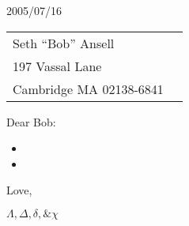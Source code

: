 \documentclass[10pt]{article}%
\def\docdate{2005/07/16}%
\begin{document}
\thispagestyle{first}

\docdate
\medskip

\begin{tabular*}{\columnwidth}{@{\extracolsep{\fill}}lr}%
  Seth ``Bob'' Ansell &\\
  197 Vassal Lane \\
  Cambridge MA 02138-6841
\end{tabular*}
\medskip

Dear Bob:

\begin{multicols}{2}

\lipsum[2-5]

\begin{itemize}
\item \lipsum[6]
\item \lipsum[7]
\end{itemize}

\lipsum[8-9]

\end{multicols}

Love,

\vspace{1cm}

{\large $\Lambda, \Delta, \delta, \& \chi$}

\vspace{3ex}

\hbox{
%
\vtop{\hsize=0.9\linewidth \lipsum[10]}%
}
\end{document}
